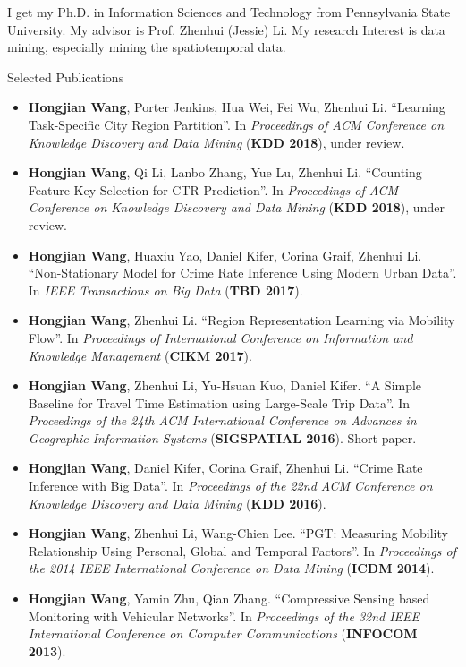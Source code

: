 
I get my Ph.D. in Information Sciences and Technology from Pennsylvania State University. My advisor is Prof. Zhenhui (Jessie) Li. My research Interest is data mining, especially mining the spatiotemporal data.


\vspace{1cm}

\centerline{Selected Publications}

\begin{itemize}
\item \textbf{Hongjian Wang}, Porter Jenkins, Hua Wei, Fei Wu, Zhenhui Li. ``Learning Task-Specific City Region Partition''. In \emph{Proceedings of ACM Conference on Knowledge Discovery and Data Mining} (\textbf{KDD 2018}), under review.
\item \textbf{Hongjian Wang}, Qi Li, Lanbo Zhang, Yue Lu, Zhenhui Li. ``Counting Feature Key Selection for CTR Prediction''. In \emph{Proceedings of ACM Conference on Knowledge Discovery and Data Mining} (\textbf{KDD 2018}), under review.
\item \textbf{Hongjian Wang}, Huaxiu Yao, Daniel Kifer, Corina Graif, Zhenhui Li. ``Non-Stationary Model for Crime Rate Inference Using Modern Urban Data''. In \emph{IEEE Transactions on Big Data} (\textbf{TBD 2017}).
\item \textbf{Hongjian Wang}, Zhenhui Li. ``Region Representation Learning via Mobility Flow''. In \emph{Proceedings of International Conference on Information and Knowledge Management} (\textbf{CIKM 2017}).
\item \textbf{Hongjian Wang}, Zhenhui Li, Yu-Hsuan Kuo, Daniel Kifer. ``A Simple Baseline for Travel Time Estimation using Large-Scale Trip Data''. In \emph{Proceedings of the 24th ACM International Conference on Advances in Geographic Information Systems} (\textbf{SIGSPATIAL 2016}). Short paper.
\item \textbf{Hongjian Wang}, Daniel Kifer, Corina Graif, Zhenhui Li. ``Crime Rate Inference with Big Data''. In \emph{Proceedings of the 22nd ACM Conference on Knowledge Discovery and Data Mining} (\textbf{KDD 2016}).
\item \textbf{Hongjian Wang}, Zhenhui Li, Wang-Chien Lee. ``PGT: Measuring Mobility Relationship Using Personal, Global and Temporal Factors''. In \emph{Proceedings of the 2014 IEEE International Conference on Data Mining} (\textbf{ICDM 2014}).
\item \textbf{Hongjian Wang}, Yamin Zhu, Qian Zhang. ``Compressive Sensing based Monitoring with Vehicular Networks''. In \emph{Proceedings of the 32nd IEEE International Conference on Computer Communications} (\textbf{INFOCOM 2013}).
\end{itemize}

